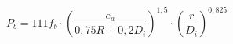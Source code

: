 \documentclass[12pt]{article}
\begin{document}
\begin{displaymath}
P_b = 111 f_b \cdot \left( {\frac {e_a} {0,75R+0,2D_i} } \right)^{1,5} \cdot \left( \frac {r} {D_i} \right)^{0,825}
\end{displaymath}
\end{document}
